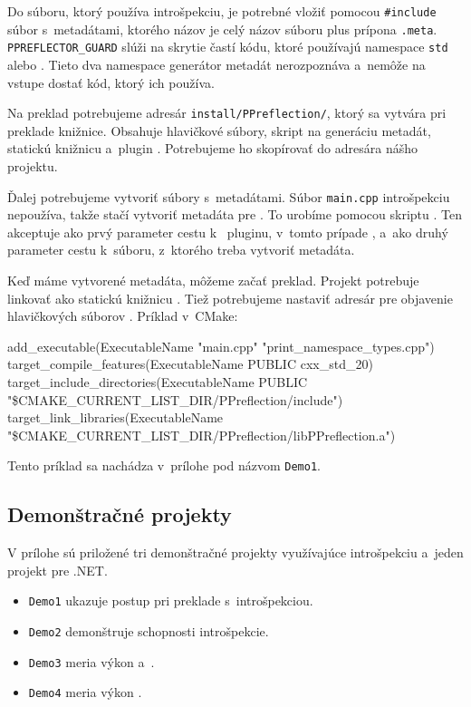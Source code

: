 Do súboru, ktorý používa introšpekciu, je potrebné vložiť pomocou \texttt{\#include} súbor s~metadátami, ktorého názov je celý názov súboru plus prípona \texttt{.meta}. \texttt{PPREFLECTOR\_GUARD} slúži na skrytie častí kódu, ktoré používajú namespace \texttt{std} alebo \PPreflection{}. Tieto dva namespace generátor metadát nerozpoznáva a~nemôže na vstupe dostať kód, ktorý ich používa.

Na preklad potrebujeme adresár \texttt{install/PPreflection/}, ktorý sa vytvára pri preklade knižnice. Obsahuje hlavičkové súbory, skript na generáciu metadát, statickú knižnicu \PPreflection{} a~plugin \PPreflector{}.  Potrebujeme ho skopírovať do adresára nášho projektu.

Ďalej potrebujeme vytvoriť súbory s~metadátami. Súbor \texttt{main.cpp} introšpekciu nepoužíva, takže stačí vytvoriť metadáta pre . To urobíme pomocou skriptu . Ten akceptuje ako prvý parameter cestu k~\PPreflector{} pluginu, v~tomto prípade , a~ako druhý parameter cestu k~súboru, z~ktorého treba vytvoriť metadáta.

Keď máme vytvorené metadáta, môžeme začať preklad. Projekt potrebuje linkovať ako statickú knižnicu \PPreflection{}. Tiež potrebujeme nastaviť adresár pre objavenie hlavičkových súborov . Príklad v~\textsf{CMake}:
\begin{code}[fontsize=\footnotesize]
add_executable(ExecutableName "main.cpp" "print_namespace_types.cpp")
target_compile_features(ExecutableName PUBLIC cxx_std_20)
target_include_directories(ExecutableName PUBLIC
    "\${CMAKE_CURRENT_LIST_DIR}/PPreflection/include")
target_link_libraries(ExecutableName
    "\${CMAKE_CURRENT_LIST_DIR}/PPreflection/libPPreflection.a")
\end{code}

Tento príklad sa nachádza v~prílohe pod názvom \texttt{Demo1}.

\subsection{Demonštračné projekty}

V prílohe sú priložené tri demonštračné projekty využívajúce introšpekciu a~jeden projekt pre \textsf{.NET}.

\begin{itemize}[itemsep=0pt]
    \item \texttt{Demo1} ukazuje postup pri preklade s~introšpekciou.
    \item \texttt{Demo2} demonštruje schopnosti introšpekcie.
    \item \texttt{Demo3} meria výkon \Cpp{} a~\PPreflection{}.
    \item \texttt{Demo4} meria výkon \Csharp{}.
\end{itemize}

